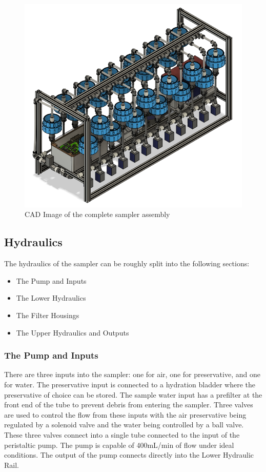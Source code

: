 \documentclass[11pt, letterpaper]{article}
\begin{document}
\begin{figure}[H]
	\centering
	\includegraphics[scale=0.5]{./Assets/Sampler CAD.png} %
	\caption{CAD Image of the complete sampler assembly}
\end{figure}

\subsection{Hydraulics}
The hydraulics of the sampler can be roughly split into the following sections:
\begin{itemize}	%
	\item The Pump and Inputs
	\item The Lower Hydraulics
	\item The Filter Housings
	\item The Upper Hydraulics and Outputs
\end{itemize}

\subsubsection{The Pump and Inputs}
There are three inputs into the sampler: one for air, one for preservative, and one for water. The preservative input is connected to a hydration bladder where the preservative of choice can be stored. The sample water input has a prefilter at the front end of the tube to prevent debris from entering the sampler. Three valves are used to control the flow from these inputs with the air preservative being regulated by a solenoid valve and the water being controlled by a ball valve. These three valves connect into a single tube connected to the input of the peristaltic pump.
The pump is capable of 400mL/min of flow under ideal conditions. The output of the pump connects directly into the Lower Hydraulic Rail. 
\end{document}

